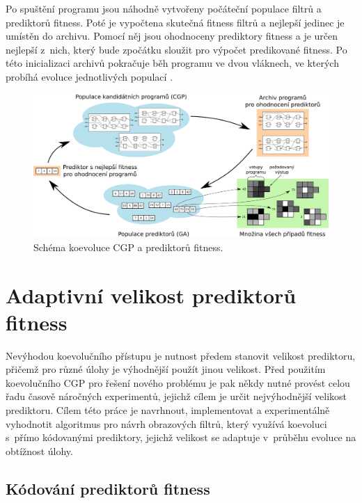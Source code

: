 \documentclass[fleqn,11pt]{ExcelAtFIT} %
\begin{document}
Po spuštění programu jsou náhodně vytvořeny po\-čá\-teč\-ní populace filtrů a prediktorů fitness. Poté je vypočtena skutečná fitness filtrů a nejlepší jedinec je umís\-těn do archivu. Pomocí něj jsou ohod\-no\-ceny prediktory fitness a je určen nejlepší z~nich, který bude zpočátku sloužit pro výpočet predikované fitness. Po této inicializaci archivů pokračuje běh programu ve dvou vláknech, ve kterých probíhá evoluce jed\-not\-li\-vých populací \cite{SikuPPSN}.

\begin{figure}[t]
    \centering\includegraphics[width=0.9\linewidth]{images/coevolution-if.pdf}
    \caption{Schéma koevoluce CGP a prediktorů fitness.}
    \label{fig:CoevolutionScheme}
\end{figure}



\section{Adaptivní velikost prediktorů fitness}
\label{sec:AdaptiveSize}

Nevýhodou koevolučního přístupu je nutnost předem stanovit velikost prediktoru, přičemž pro různé úlohy je výhodnější použít jinou velikost. Před použitím koevolučního CGP pro řešení nového problému je pak někdy nutné provést celou řadu časově náročných experimentů, jejichž cílem je určit nejvýhodnější velikost prediktoru. Cílem této práce je navrhnout, implementovat a experimentálně vyhodnotit algoritmus pro návrh obrazových filtrů, který využívá koevoluci s~přímo kódovanými prediktory, jejichž velikost se adaptuje v~průběhu evoluce na obtížnost úlohy.

\subsection{Kódování prediktorů fitness}
\end{document}
